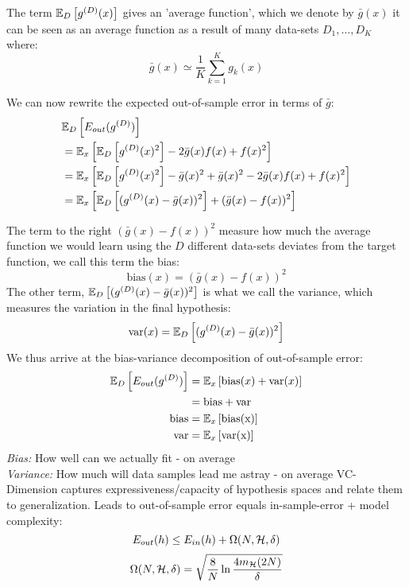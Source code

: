     The term $\mathbb{E}_D\left[g^{(D)}(x)\right]$ gives an 'average function', which 
    we denote by $\bar{g}(x)$ it can be seen as an average function as a result 
    of many data-sets $D_1,\dots,D_K$ where:
    \begin{equation}
        \bar{g}(x)\simeq \frac{1}{K} \sum_{k=1}^{K}g_k(x)
    \end{equation}
    
    We can now rewrite the expected out-of-sample error in terms of $\bar{g}$:
    \begin{align*}
        &\mathbb{E}_D\left[E_{out}(g^{(D)})\right]\\
        &=\mathbb{E}_x\left[\mathbb{E}_D\left[g^{(D)}(x)^2\right] - 2\bar{g}(x)f(x)+ 
        f(x)^2\right]\\
        &=\mathbb{E}_x\left[\mathbb{E}_D\left[g^{(D)}(x)^2\right]-\bar{g}(x)^2 + \bar{g}(x)^2 
        - 2\bar{g}(x)f(x)+f(x)^2\right]\\
        &=\mathbb{E}_x\left[\mathbb{E}_D\left[(g^{(D)}(x) - \bar{g}(x))^2\right] + 
        (\bar{g}(x)-f(x))^2\right]
    \end{align*}
    
    The term to the right $(\bar{g}(x)-f(x))^2$ measure how much the average 
    function we would learn using the $D$ different data-sets deviates from the 
    target function, we call this term the bias:
    \begin{equation*}
        \text{bias}(x)=(\bar{g}(x)-f(x))^2
    \end{equation*}
    The other term, $\mathbb{E}_D\left[(g^{(D)}(x)-\bar{g}(x))^2\right]$ is what we 
    call the variance, which measures the variation in the final hypothesis:
    \begin{equation}
        \text{var}(x)=\mathbb{E}_D\left[(g^{(D)}(x)-\bar{g}(x))^2\right]
    \end{equation}
    We thus arrive at the bias-variance decomposition of out-of-sample error:
    \begin{align*}
        \mathbb{E}_D\left[E_{out}(g^{(D)})\right] &= \mathbb{E}_x\left[\text{bias}(x) + 
        \text{var}(x)\right]\\
            &= \text{bias} + \text{var}\\
        \text{bias} &= \mathbb{E}_x\left[\text{bias(x)}\right]\\
        \text{var} &= \mathbb{E}_x\left[\text{var(x)}\right]
    \end{align*}
    \textit{Bias:} How well can we actually fit - on average\\
    \textit{Variance:} How much will data samples lead me astray - on average
    VC-Dimension captures expressiveness/capacity of hypothesis spaces and 
    relate them to generalization. Leads to out-of-sample error equals 
    in-sample-error + model complexity:
    \begin{equation*}
        E_{out}(h) \leq E_{in}(h) + \Omega(N,\mathcal{H}, \delta)
    \end{equation*}
    \begin{equation*}
        \Omega(N, \mathcal{H}, \delta) = \sqrt{\frac{8}{N}\ln\frac{4m_{\mathcal{H}}(2N)}{\delta}}
    \end{equation*}
    

